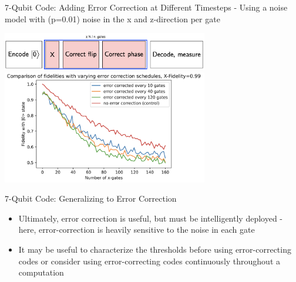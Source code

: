 \documentclass{beamer}
\begin{document}
\begin{frame}{7-Qubit Code: Adding Error Correction at Different Timesteps}
  - Using a noise model with (p=0.01) noise in the x and z-direction per gate 
  \begin{center}
   \includegraphics[width=9cm]{7qb-diagram}
    \includegraphics[width=9cm]{7-schedule-comparison-2.png}
  \end{center}
\end{frame}

\begin{frame}{7-Qubit Code: Generalizing to Error Correction}
    \begin{itemize}
        \item Ultimately, error correction is useful, but must be intelligently deployed - here, error-correction is heavily sensitive to the noise in each gate
        \item It may be useful to characterize the thresholds before using error-correcting codes or consider using error-correcting codes continuously throughout a computation
    \end{itemize}
\end{frame}
\end{document}
